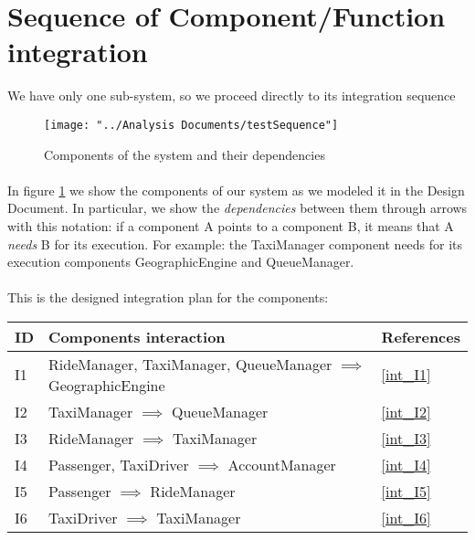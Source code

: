 \section{Sequence of Component/Function integration}
We have only one sub-system, so we proceed directly to its integration sequence
\begin{figure}[H]
	\centering
	\texttt{[image: "../Analysis Documents/testSequence"]}
	\caption{Components of the system and their dependencies}
	\label{fig:components}
\end{figure}
\paragraph{}In figure \ref{fig:components} we show the components of our system as we modeled it in the Design Document. In particular, we show the \textit{dependencies} between them through arrows with this notation: if a component A points to a component B, it means that A \textit{needs} B for its execution. For example: the TaxiManager component needs for its execution components GeographicEngine and QueueManager.

\paragraph{} This is the designed integration plan for the components:
\begin{center}
	\begin{tabular}{ l | l | l }
	\textbf{ID} & \textbf{Components interaction} & References \\ \hline
	I1 \label{I1} & RideManager, TaxiManager, QueueManager $\implies$ GeographicEngine & \ref{int_I1} \\ \hline
	I2 \label{I2} & TaxiManager $\implies$ QueueManager & \ref{int_I2} \\ \hline
	I3 \label{I3} & RideManager $\implies$ TaxiManager & \ref{int_I3}\\ \hline
	I4 \label{I4} & Passenger, TaxiDriver $\implies$ AccountManager & \ref{int_I4}\\ \hline
	I5 \label{I5} & Passenger $\implies$ RideManager & \ref{int_I5}\\ \hline
	I6 \label{I6} & TaxiDriver $\implies$ TaxiManager & \ref{int_I6}\\
	\end{tabular}
\end{center}
%
%
